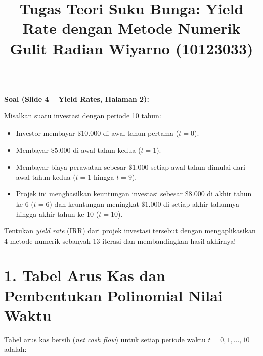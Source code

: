 \documentclass[11pt,a4paper]{article}
\title{\vspace{-1.5cm}\textbf{Tugas Teori Suku Bunga: Yield Rate dengan Metode Numerik}\\\large Gulit Radian Wiyarno (10123033)\vspace{-0.8cm}}
\author{}
\date{}
\begin{document}
\maketitle

\vspace{-0.5em}
\hrule
\vspace{0.8em}

\begin{tcolorbox}
\textbf{Soal (Slide 4 -- Yield Rates, Halaman 2):}

Misalkan suatu investasi dengan periode 10 tahun:
\begin{itemize}[leftmargin=1.5em, topsep=0pt, itemsep=0pt]
    \item Investor membayar $\$10.000$ di awal tahun pertama ($t = 0$).
    \item Membayar $\$5.000$ di awal tahun kedua ($t = 1$).
    \item Membayar biaya perawatan sebesar $\$1.000$ setiap awal tahun dimulai dari awal tahun kedua ($t = 1$ hingga $t = 9$).
    \item Projek ini menghasilkan keuntungan investasi sebesar $\$8.000$ di akhir tahun ke-6 ($t = 6$) dan keuntungan meningkat $\$1.000$ di setiap akhir tahunnya hingga akhir tahun ke-10 ($t = 10$).
\end{itemize}
Tentukan \textit{yield rate} (IRR) dari projek investasi tersebut dengan mengaplikasikan 4 metode numerik sebanyak 13 iterasi dan membandingkan hasil akhirnya!
\end{tcolorbox}

\section*{1. Tabel Arus Kas dan Pembentukan Polinomial Nilai Waktu}

Tabel arus kas bersih (\textit{net cash flow}) untuk setiap periode waktu $t = 0, 1, \dots, 10$ adalah:
\end{document}
